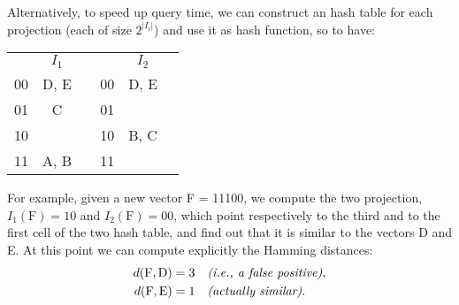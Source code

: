 Alternatively, to speed up query time, we can construct an hash table for each
projection (each of size $2^{|I_i|}$) and use it as hash function, so to have:
%
\begin{table}[h]
  \centering
  \begin{tabular}{c|c|cc|c|c}
    \multicolumn{1}{c}{} &
    \multicolumn{1}{c}{$I_1$} &
    \multicolumn{1}{c}{} &
    \multicolumn{1}{c}{} &
    \multicolumn{1}{c}{$I_2$} & \\ \cline{2-2} \cline{5-5}
    00 & D, E & & 00 & D, E & \\ \cline{2-2} \cline{5-5}
    01 & C & & 01 & & \\ \cline{2-2} \cline{5-5}
    10 & & & 10 & B, C & \\ \cline{2-2} \cline{5-5}
    11 & A, B & & 11 & & \\ \cline{2-2} \cline{5-5}
  \end{tabular}
\end{table}

For example, given a new vector F = 11100, we compute the two projection,
$I_1(\text{F}) = 10$ and $I_2(\text{F}) = 00$, which point respectively to the
third and to the first cell of the two hash table, and find out that it is
similar to the vectors D and E. At this point we can compute explicitly the
Hamming distances:
%
\begin{align*}
  d(\text{F}, \text{D}) &= 3 \quad \text{\em (i.e., a false positive)},\\
  d(\text{F}, \text{E}) &= 1 \quad \text{\em (actually similar)}.
\end{align*}
